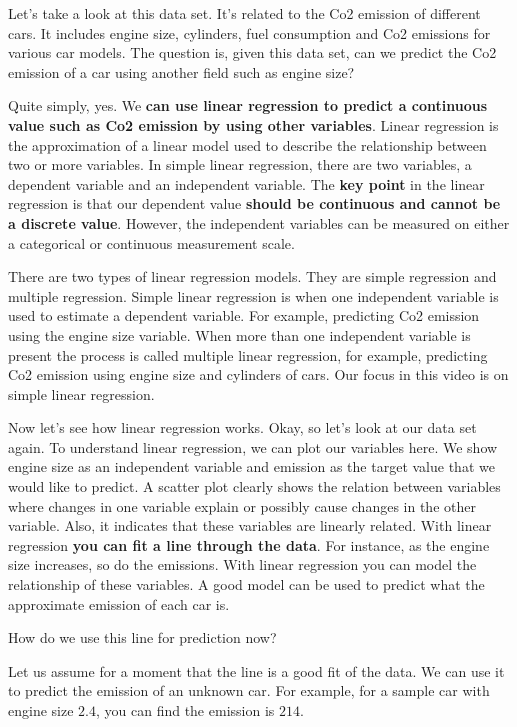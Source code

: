 	Let's take a look at this data set. It's related to the Co2 emission of different cars. It includes engine size, cylinders, fuel consumption and Co2 emissions for various car models. The question is, given this data set, can we predict the Co2 emission of a car using another field such as engine size? 
	
	Quite simply, yes. We \textbf{can use linear regression to predict a continuous value such as Co2 emission by using other variables}. Linear regression is the approximation of a linear model used to describe the relationship between two or more variables. In simple linear regression, there are two variables, a dependent variable and an independent variable.
	The \textbf{key point} in the linear regression is that our dependent value \textbf{should be continuous and cannot be a discrete value}. However, the independent variables can be measured on either a categorical or continuous measurement scale. 
	
	There are two types of linear regression models. They are simple regression and multiple regression. Simple linear regression is when one independent variable is used to estimate a dependent variable. For example, predicting Co2 emission using the engine size variable. When more than one independent variable is present the process is called multiple linear regression, for example, predicting Co2 emission using engine size and cylinders of cars. Our focus in this video is on simple linear regression. 
	
	Now let's see how linear regression works. Okay, so let's look at our data set again. To understand linear regression, we can plot our variables here. We show engine size as an independent variable and emission as the target value that we would like to predict. A scatter plot clearly shows the relation between variables where changes in one variable explain or possibly cause changes in the other variable. Also, it indicates that these variables are linearly related. With linear regression \textbf{you can fit a line through the data}. For instance, as the engine size increases, so do the emissions. With linear regression you can model the relationship of these variables. A good model can be used to predict what the approximate emission of each car is.
	
	How do we use this line for prediction now?
	
	Let us assume for a moment that the line is a good fit of the data. We can use it to predict the emission of an unknown car. For example, for a sample car with engine size $2.4$, you can find the emission is $214$.
	

